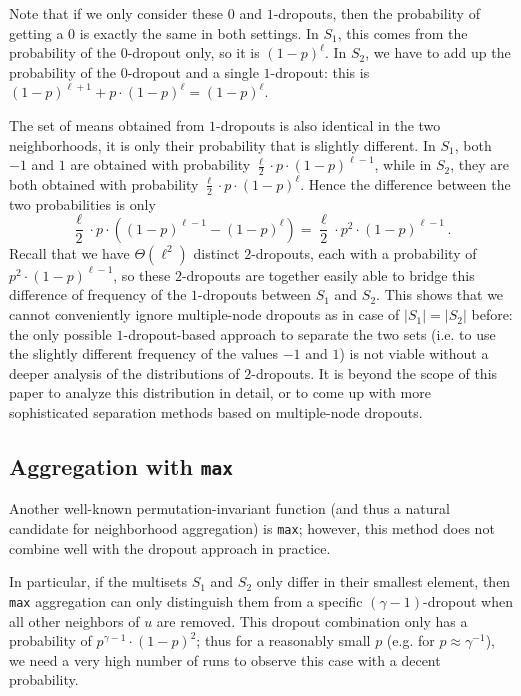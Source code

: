 \documentclass{article}
\begin{document}
Note that if we only consider these $0$ and $1$-dropouts, then the probability of getting a $0$ is exactly the same in both settings. In $S_1$, this comes from the probability of the $0$-dropout only, so it is $(1-p)^{\ell}$. In $S_2$, we have to add up the probability of the $0$-dropout and a single $1$-dropout: this is $(1-p)^{\ell+1} + p \cdot (1-p)^{\ell} = (1-p)^{\ell}$.

The set of means obtained from $1$-dropouts is also identical in the two neighborhoods, it is only their probability that is slightly different. In $S_1$, both $-1$ and $1$ are obtained with probability $\frac{\ell}{2} \cdot p \cdot (1-p)^{\ell-1}$, while in $S_2$, they are both obtained with probability $\frac{\ell}{2} \cdot p \cdot (1-p)^{\ell}$. Hence the difference between the two probabilities is only
\[ \frac{\ell}{2} \cdot p \cdot \left((1-p)^{\ell-1} - (1-p)^{\ell}\right) = \frac{\ell}{2} \cdot p^2 \cdot (1-p)^{\ell-1} \, . \]
Recall that we have $\Theta(\ell^2)$ distinct $2$-dropouts, each with a probability of $p^2 \cdot (1-p)^{\ell-1}$, so these $2$-dropouts are together easily able to bridge this difference of frequency of the $1$-dropouts between $S_1$ and $S_2$. This shows that we cannot conveniently ignore multiple-node dropouts as in case of $|S_1|=|S_2|$ before: the only possible $1$-dropout-based approach to separate the two sets (i.e. to use the slightly different frequency of the values $-1$ and $1$) is not viable without a deeper analysis of the distributions of $2$-dropouts. It is beyond the scope of this paper to analyze this distribution in detail, or to come up with more sophisticated separation methods based on multiple-node dropouts.

\subsection{Aggregation with \texttt{max}}

Another well-known permutation-invariant function (and thus a natural candidate for neighborhood aggregation) is \texttt{max}; however, this method does not combine well with the dropout approach in practice.

In particular, if the multisets $S_1$ and $S_2$ only differ in their smallest element, then \texttt{max} aggregation can only distinguish them from a specific $(\gamma-1)$-dropout when all other neighbors of $u$ are removed. This dropout combination only has a probability of $p^{\gamma-1} \cdot (1-p)^2$; thus for a reasonably small $p$ (e.g. for $p \approx \gamma^{-1}$), we need a very high number of runs to observe this case with a decent probability.
\end{document}
